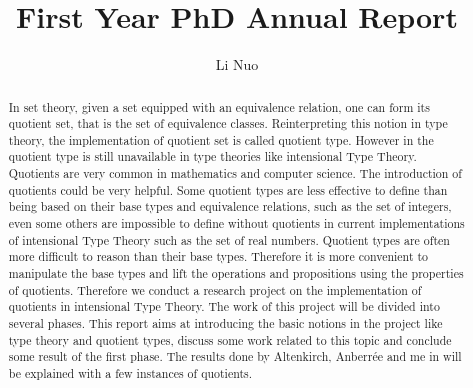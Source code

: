 \documentclass{article}
\author{Li Nuo}
\title{First Year PhD Annual Report}
\theoremstyle{definition}
\newcommand{\todo}[1]{\textcolor{red}{TO~DO:~#1}}
\newcommand{\itt}{intensional Type Theory}
\begin{document}
\maketitle

\tableofcontents

\newpage

\begin{abstract}



In set theory, given a set equipped with an equivalence relation, one can form its
quotient set, that is the set of equivalence classes. Reinterpreting
this notion in type theory, the implementation of quotient set is
called quotient type. However in the quotient type is still
unavailable in type theories like \itt{}. Quotients are very common in
mathematics and computer science. The introduction of quotients could
be very helpful. Some quotient types are less effective to define than
being based on their base types and equivalence relations, such as the
set of integers, even some others are impossible to define without
quotients in current implementations of \itt{} such as the set of real
numbers. Quotient types are often more difficult to reason than their
base types. Therefore it is more convenient to manipulate the base
types and lift the operations and propositions using the properties of
quotients. 
Therefore we conduct a research project on the implementation of quotients in
\itt{}. The work of this project will be divided into several phases. This report aims at
introducing the basic notions in the project like type theory and
quotient types, discuss some work related to this
topic and conclude some result of the first phase. The results done by
Altenkirch, Anberr\'{e}e and me in \cite{aan} will be explained with a
few instances of quotients.


\end{abstract}
\end{document}

